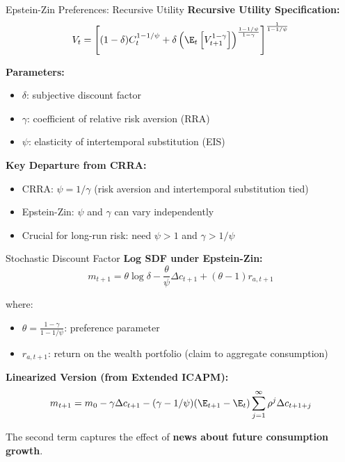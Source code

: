 \documentclass{beamer}
\begin{document}
\begin{frame}{Epstein-Zin Preferences: Recursive Utility}
    \textbf{Recursive Utility Specification:}
    \begin{equation}
        V_t = \left[ (1-\delta) C_t^{1-1/\psi} + \delta \left( \E_t\left[ V_{t+1}^{1-\gamma} \right] \right)^{\frac{1-1/\psi}{1-\gamma}} \right]^{\frac{1}{1-1/\psi}}
    \end{equation}
    
    \textbf{Parameters:}
    \begin{itemize}
        \item $\delta$: subjective discount factor
        \item $\gamma$: coefficient of relative risk aversion (RRA)
        \item $\psi$: elasticity of intertemporal substitution (EIS)
    \end{itemize}
    
    \vspace{0.3cm}
    \textbf{Key Departure from CRRA:}
    \begin{itemize}
        \item CRRA: $\psi = 1/\gamma$ (risk aversion and intertemporal substitution tied)
        \item Epstein-Zin: $\psi$ and $\gamma$ can vary independently
        \item Crucial for long-run risk: need $\psi > 1$ and $\gamma > 1/\psi$
    \end{itemize}
\end{frame}

\begin{frame}{Stochastic Discount Factor}
    \textbf{Log SDF under Epstein-Zin:}
    \begin{equation}
        m_{t+1} = \theta \log \delta - \frac{\theta}{\psi} \Delta c_{t+1} + (\theta - 1) r_{a,t+1}
    \end{equation}
    
    where:
    \begin{itemize}
        \item $\theta = \frac{1-\gamma}{1-1/\psi}$: preference parameter
        \item $r_{a,t+1}$: return on the wealth portfolio (claim to aggregate consumption)
    \end{itemize}
    
    \vspace{0.3cm}
    \textbf{Linearized Version (from Extended ICAPM):}
    \begin{equation}
        m_{t+1} = m_0 - \gamma \Delta c_{t+1} - (\gamma - 1/\psi)(\E_{t+1} - \E_t) \sum_{j=1}^{\infty} \rho^j \Delta c_{t+1+j}
    \end{equation}
    
    The second term captures the effect of \textbf{news about future consumption growth}.
\end{frame}
\end{document}
